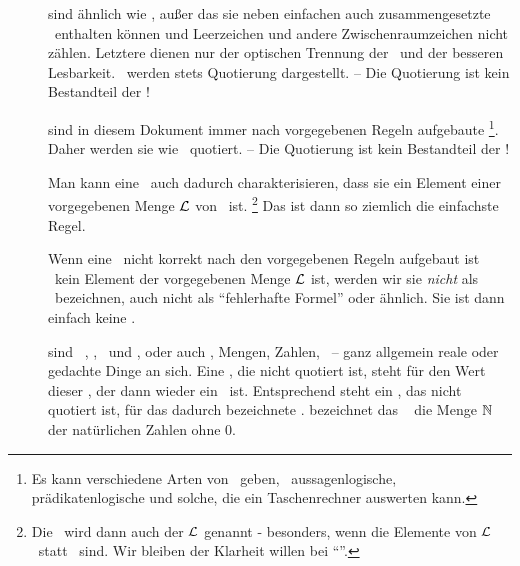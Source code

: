 \begin{description}
	\item [\Zeichenfolgen] sind ähnlich wie \Zeichenketten, außer das sie neben einfachen auch zusammengesetzte \Symbole\ enthalten können und Leerzeichen und andere Zwischenraumzeichen nicht zählen.
	Letztere dienen nur der optischen Trennung der \Symbole\ und der besseren Lesbarkeit.
	\Zeichenfolgen\ werden stets  Quotierung dargestellt.
	-- Die Quotierung ist kein Bestandteil der \Zeichenfolge!

	\item [\Formeln] \label{def:Formel} sind in diesem Dokument immer nach vorgegebenen Regeln aufgebaute \Zeichenfolgen%
	\footnote{%
		Es kann verschiedene Arten von \Formeln\ geben, \textzB\ aussagenlogische, prädikatenlogische und solche, die ein Taschenrechner auswerten kann.
	}.
	Daher werden sie wie \Zeichenfolgen\ quotiert.
	-- Die Quotierung ist kein Bestandteil der \Zeichenfolge!

	Man kann eine \Formel\ auch dadurch charakterisieren, dass sie ein Element einer vorgegebenen Menge $\mathcal{L}$ von \Zeichenfolgen\ ist.%
	\footnote{%
		Die \Formel\ wird dann auch  der  $\mathcal{L}$ genannt - besonders, wenn die Elemente von $\mathcal{L}$ \Zeichenketten\ statt \Zeichenfolgen\ sind.
		Wir bleiben der Klarheit willen bei \enquote{\Formel}.
	}
	Das ist dann so ziemlich die einfachste Regel.

	Wenn eine \Zeichenfolge\ nicht korrekt nach den vorgegebenen Regeln aufgebaut ist \textbzw\ kein Element der vorgegebenen Menge $\mathcal{L}$ ist, werden wir sie \emph{nicht} als \Formel\ bezeichnen, auch nicht als \enquote{fehlerhafte Formel} oder ähnlich.
	Sie ist dann einfach keine \Formel.

	\item [\Objekte] sind \textzB\ \Symbole, \Zeichenketten, \Zeichenfolgen\ und \Formeln, oder auch \Aussagen, Mengen, Zahlen, \textusw\ -- ganz allgemein reale oder gedachte Dinge an sich.
	Eine \Formel, die nicht quotiert ist, steht für den Wert dieser \Formel, der dann wieder ein \Objekt\ ist.
	Entsprechend steht ein \Symbol, das nicht quotiert ist, für das dadurch bezeichnete \Objekt.
	\textZB bezeichnet das \Symbol\ \chrqt{$\IN$} die Menge $\IN$ der natürlichen Zahlen ohne 0.

\end{description}

